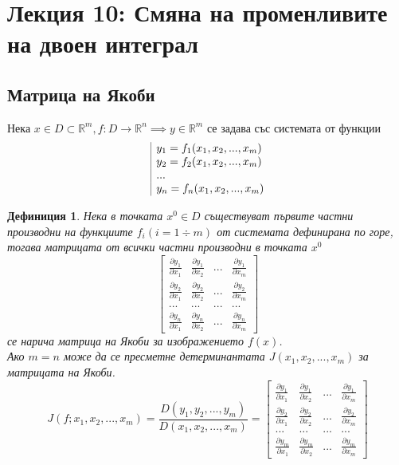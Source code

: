\documentclass[a4paper,fleqn,12pt]{article}
\newtheorem{definition}{Дефиниция}[subsection]
\theoremstyle{definition}
\begin{document}
\newpage
\section{Лекция 10: Смяна на променливите на двоен интеграл}

\subsection{Матрица на Якоби}
Нека $x \in D \subset \mathbb{R}^m, f: D \to \mathbb{R}^n \implies y \in \mathbb{R}^m$ се задава със системата от функции
$$\begin{array}{|l@{}}
y_1 = f_1(x_1, x_2, ..., x_m) \\
y_2 = f_2(x_1, x_2, ..., x_m) \\
...\\
y_n = f_n(x_1, x_2, ..., x_m) 
\end{array}$$

\begin{definition}
Нека в точката $x^0 \in D$ съществуват първите частни производни на функциите $f_i (i = 1 \div m)$ от системата дефинирана по горе, тогава матрицата от всички частни производни в точката $x^0$
$$
\begin{bmatrix}
\frac{\partial y_1}{\partial x_1} &  \frac{\partial y_1}{\partial x_2}  & ... &\frac{\partial y_1}{\partial x_m}\\ 
\frac{\partial y_2}{\partial x_1} &  \frac{\partial y_2}{\partial x_2}  & ... &\frac{\partial y_2}{\partial x_m}\\ 
...& ... & ... & ... \\
\frac{\partial y_n}{\partial x_1} &  \frac{\partial y_n}{\partial x_2}  & ... &\frac{\partial y_n}{\partial x_m}
\end{bmatrix}
$$
се нарича матрица на Якоби за изображението $f(x)$.\\
Ако $m = n$ може да се пресметне детерминантата $J(x_1, x_2, ..., x_m)$ за матрицата на Якоби. 
$$J(f;x_1, x_2, ..., x_m) = \frac{D(y_1, y_2, ..., y_m)}{D(x_1, x_2, ..., x_m)} = 
\begin{bmatrix}
\frac{\partial y_1}{\partial x_1} &  \frac{\partial y_1}{\partial x_2}  & ... &\frac{\partial y_1}{\partial x_m}\\ 
\frac{\partial y_2}{\partial x_1} &  \frac{\partial y_2}{\partial x_2}  & ... &\frac{\partial y_2}{\partial x_m}\\ 
...& ... & ... & ... \\
\frac{\partial y_m}{\partial x_1} &  \frac{\partial y_m}{\partial x_2}  & ... &\frac{\partial y_m}{\partial x_m}
\end{bmatrix}$$
\end{definition}
\end{document}

